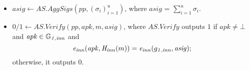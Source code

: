 \begin{construction}
\begin{itemize}
\item $\mathit{asig} \leftarrow \mathit{AS.AggSigs}(\mathit{pp}, (\sigma_i)_{i=1}^u)$, where $\mathit{asig}$ = $\sum_{i=1}^{u} \sigma_i$.  

\item $0/1 \leftarrow  \mathit{AS.Verify}(\mathit{pp}, \mathit{apk}, m, \mathit{asig})$, where $\mathit{AS.Verify}$ outputs $1$ if $\mathit{apk} \neq \bot$ and
$\mathit{apk} \in \mathbb{G}_{\mathit{1,inn}}$ and  $$\mathit{e}_{\mathit{inn}}(\mathit{apk}, \mathit{H}_{\mathit{inn}}(m)) = \mathit{e}_{\mathit{inn}}(g_{\mathit{1,inn}}, \mathit{asig});$$ otherwise, it outputs $0$.
\end{itemize}
\end{construction}